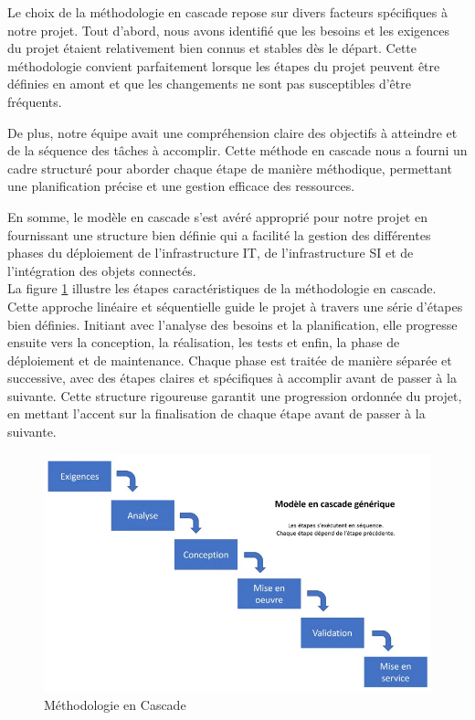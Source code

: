 Le choix de la méthodologie en cascade repose sur divers facteurs spécifiques à notre projet. Tout d'abord, nous avons identifié que les besoins et les exigences du projet étaient relativement bien connus et stables dès le départ. Cette méthodologie convient parfaitement lorsque les étapes du projet peuvent être définies en amont et que les changements ne sont pas susceptibles d'être fréquents.

De plus, notre équipe avait une compréhension claire des objectifs à atteindre et de la séquence des tâches à accomplir. Cette méthode en cascade nous a fourni un cadre structuré pour aborder chaque étape de manière méthodique, permettant une planification précise et une gestion efficace des ressources. 

En somme, le modèle en cascade s'est avéré approprié pour notre projet en fournissant une structure bien définie qui a facilité la gestion des différentes phases du déploiement de l'infrastructure IT, de l'infrastructure SI et de l'intégration des objets connectés. \\


La figure \ref{Chap1.4} illustre les étapes caractéristiques de la méthodologie en cascade. Cette approche linéaire \cite{blogcasacade} et séquentielle guide le projet à travers une série d'étapes bien définies. Initiant avec l'analyse des besoins et la planification, elle progresse ensuite vers la conception, la réalisation, les tests et enfin, la phase de déploiement et de maintenance. Chaque phase est traitée de manière séparée et successive, avec des étapes claires et spécifiques à accomplir avant de passer à la suivante. Cette structure rigoureuse garantit une progression ordonnée du projet, en mettant l'accent sur la finalisation de chaque étape avant de passer à la suivante.


\begin{figure}[H]
 \centering
    \includegraphics[width=15cm]{Images/cascade1.png}
    \caption{Méthodologie en Cascade}
    \label{Chap1.4}
\end{figure}

